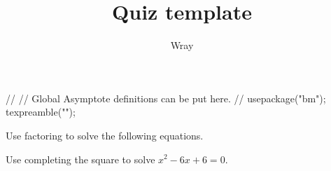 \documentclass[addpoints, 12pt]{exam}
\title{Quiz template}
\author{Wray}
\begin{document}
\begin{asydef}
//
// Global Asymptote definitions can be put here.
//
usepackage("bm");
texpreamble("\def\V#1{\bm{#1}}");
\end{asydef}



\bigskip

             
\bigskip
\bigskip

\smallskip

\begin{questions}

\question
Use factoring to solve the following equations.
\newpage 

\question[8]
Use completing the square to solve $x^2 - 6x + 6 = 0$.


\end{questions}
\end{document}
